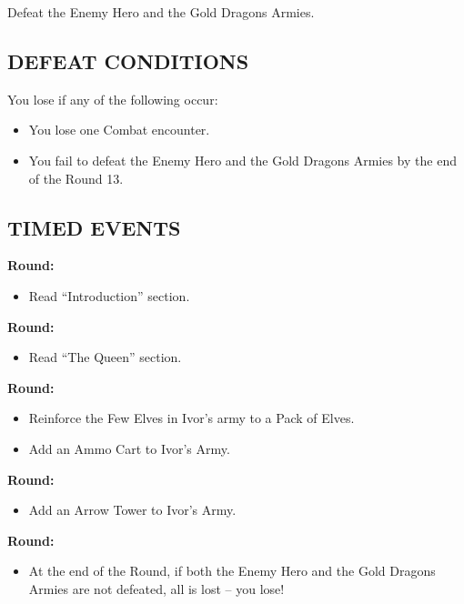 \begin{multicols*}{2}
Defeat the Enemy Hero and the Gold Dragons Armies.

\subsection*{\MakeUppercase{Defeat Conditions}}

You lose if any of the following occur:
\begin{itemize}
  \item You lose one Combat encounter.
  \item You fail to defeat the Enemy Hero and the Gold Dragons Armies by the end of the Round 13.
\end{itemize}


\vspace*{\fill}
\columnbreak

\subsection*{\MakeUppercase{Timed Events}}

\textbf{ Round:}
\begin{itemize}
  \item Read ``Introduction'' section.
\end{itemize}

\textbf{ Round:}
\begin{itemize}
  \item Read ``The Queen'' section.
\end{itemize}

\textbf{ Round:}
\begin{itemize}
  \item Reinforce the Few Elves in Ivor's army to a Pack of Elves.
  \item Add an Ammo Cart to Ivor's Army.
\end{itemize}

\textbf{ Round:}
\begin{itemize}
  \item Add an Arrow Tower to Ivor's Army.
\end{itemize}

\textbf{ Round:}
\begin{itemize}
  \item At the end of the Round, if both the Enemy Hero and the Gold Dragons Armies are not defeated, all is lost -- you lose!
\end{itemize}


\end{multicols*}
